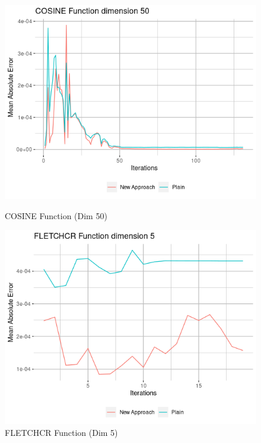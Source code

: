 \documentclass{article}
\begin{document}
\begin{figure}[H]
\begin{minipage}[b]{0.5\linewidth}
		\vspace{4ex}
	\end{minipage} 
	\begin{minipage}[b]{0.5\linewidth}
		\centering
		\includegraphics[scale=0.5]{plots/COSINE_dim50.png}  
		\caption{COSINE Function (Dim 50)} 
		\vspace{4ex}
	\end{minipage}%
	\begin{minipage}[b]{0.5\linewidth}
		\centering
		\includegraphics[scale=0.5]{plots/FLETCHCR_dim5.png} 
		\caption{FLETCHCR Function (Dim 5)} 
		\vspace{4ex}
	\end{minipage} 
\end{figure}
\end{document}
